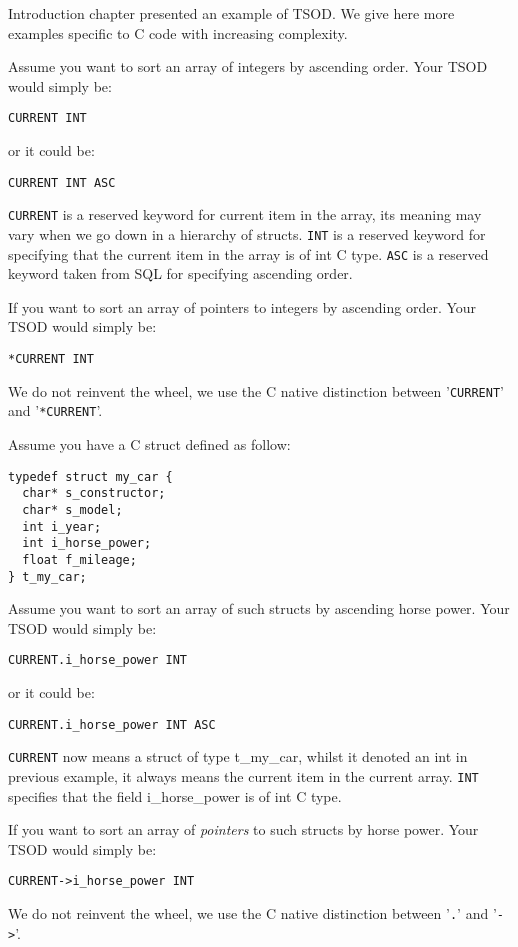 \documentclass[a4paper,11pt]{report}
\begin{document}
Introduction chapter presented an example of TSOD.
We give here more examples specific to C code with increasing complexity.

Assume you want to sort an array of integers by ascending order.
Your TSOD would simply be:
\begin{verbatim}
CURRENT INT
\end{verbatim}
or it could be:
\begin{verbatim}
CURRENT INT ASC
\end{verbatim}
\verb?CURRENT? is a reserved keyword for current item in the array,
its meaning may vary when we go down in a hierarchy of structs.
\verb?INT? is a reserved keyword for specifying that the current item in the array is of int C type.
\verb?ASC? is a reserved keyword taken from SQL for specifying ascending order.

If you want to sort an array of pointers to integers by ascending order.
Your TSOD would simply be:
\begin{verbatim}
*CURRENT INT
\end{verbatim}
We do not reinvent the wheel, we use the C native distinction between '\verb?CURRENT?' and '\verb?*CURRENT?'.

Assume you have a C struct defined as follow:
\begin{verbatim}
typedef struct my_car {
  char* s_constructor;
  char* s_model;
  int i_year;
  int i_horse_power;
  float f_mileage;
} t_my_car;
\end{verbatim}

Assume you want to sort an array of such structs by ascending horse power.
Your TSOD would simply be:
\begin{verbatim}
CURRENT.i_horse_power INT
\end{verbatim}
or it could be:
\begin{verbatim}
CURRENT.i_horse_power INT ASC
\end{verbatim}
\verb?CURRENT? now means a struct of type t\_my\_car, whilst it denoted an int in previous example,
it always means the current item in the current array.
\verb?INT? specifies that the field i\_horse\_power is of int C type.

If you want to sort an array of \emph{pointers} to such structs by horse power.
Your TSOD would simply be:
\begin{verbatim}
CURRENT->i_horse_power INT
\end{verbatim}
We do not reinvent the wheel, we use the C native distinction between '\verb?.?' and '\verb?->?'.
\end{document}
